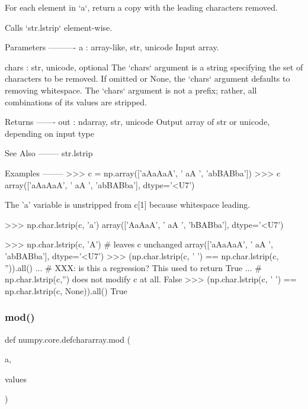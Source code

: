 \begin{DoxyVerb}For each element in `a`, return a copy with the leading characters
removed.

Calls `str.lstrip` element-wise.

Parameters
----------
a : array-like, {str, unicode}
    Input array.

chars : {str, unicode}, optional
    The `chars` argument is a string specifying the set of
    characters to be removed. If omitted or None, the `chars`
    argument defaults to removing whitespace. The `chars` argument
    is not a prefix; rather, all combinations of its values are
    stripped.

Returns
-------
out : ndarray, {str, unicode}
    Output array of str or unicode, depending on input type

See Also
--------
str.lstrip

Examples
--------
>>> c = np.array(['aAaAaA', '  aA  ', 'abBABba'])
>>> c
array(['aAaAaA', '  aA  ', 'abBABba'], dtype='<U7')

The 'a' variable is unstripped from c[1] because whitespace leading.

>>> np.char.lstrip(c, 'a')
array(['AaAaA', '  aA  ', 'bBABba'], dtype='<U7')


>>> np.char.lstrip(c, 'A') # leaves c unchanged
array(['aAaAaA', '  aA  ', 'abBABba'], dtype='<U7')
>>> (np.char.lstrip(c, ' ') == np.char.lstrip(c, '')).all()
... # XXX: is this a regression? This used to return True
... # np.char.lstrip(c,'') does not modify c at all.
False
>>> (np.char.lstrip(c, ' ') == np.char.lstrip(c, None)).all()
True\end{DoxyVerb}
 \mbox{\label{namespacenumpy_1_1core_1_1defchararray_a161e1ba16e5cefbd7fc1d4ceb66b9c2a}} 
\subsubsection{\texorpdfstring{mod()}{mod()}}
{\footnotesize\ttfamily def numpy.\+core.\+defchararray.\+mod (\begin{DoxyParamCaption}\item[{}]{a,  }\item[{}]{values }\end{DoxyParamCaption})}

